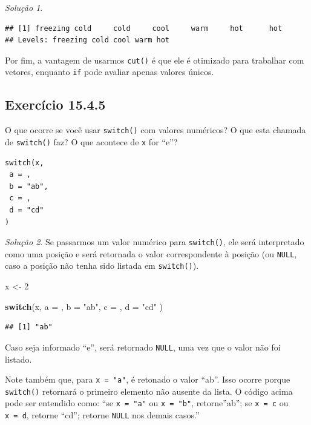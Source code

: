\documentclass[
]{latex/krantz}
\newenvironment{Shaded}{\begin{snugshade}}{\end{snugshade}}
\newcommand{\AttributeTok}[1]{\textcolor[rgb]{0.13,0.29,0.53}{#1}}
\newcommand{\ControlFlowTok}[1]{\textcolor[rgb]{0.13,0.29,0.53}{\textbf{#1}}}
\newcommand{\DecValTok}[1]{\textcolor[rgb]{0.00,0.00,0.81}{#1}}
\newcommand{\NormalTok}[1]{#1}
\newcommand{\OtherTok}[1]{\textcolor[rgb]{0.56,0.35,0.01}{#1}}
\newcommand{\StringTok}[1]{\textcolor[rgb]{0.31,0.60,0.02}{#1}}
\theoremstyle{definition}
\theoremstyle{definition}
\theoremstyle{definition}
\theoremstyle{definition}
\theoremstyle{remark}
\newtheorem*{solution}{Solução}
\begin{document}
\begin{solution}
\begin{verbatim}
## [1] freezing cold     cold     cool     warm     hot      hot     
## Levels: freezing cold cool warm hot
\end{verbatim}

Por fim, a vantagem de usarmos \texttt{cut()} é que ele é otimizado para trabalhar com vetores, enquanto \texttt{if} pode avaliar apenas valores únicos.
\end{solution}

\hypertarget{exr15-4-5}{%
\subsection*{Exercício 15.4.5}\label{exr15-4-5}}

O que ocorre se você usar \texttt{switch()} com valores numéricos? O que esta chamada de \texttt{switch()} faz? O que acontece de \texttt{x} for ``e''?

\begin{verbatim}
switch(x,
 a = ,
 b = "ab",
 c = ,
 d = "cd"
)
\end{verbatim}

\begin{solution}
Se passarmos um valor numérico para \texttt{switch()}, ele será interpretado como uma posição e será retornada o valor correspondente à posição (ou \texttt{NULL}, caso a posição não tenha sido listada em \texttt{switch()}).

\begin{Shaded}
\begin{Highlighting}[]
\NormalTok{x }\OtherTok{\textless{}{-}} \DecValTok{2}

\ControlFlowTok{switch}\NormalTok{(x,}
 \AttributeTok{a =}\NormalTok{ ,}
 \AttributeTok{b =} \StringTok{"ab"}\NormalTok{,}
 \AttributeTok{c =}\NormalTok{ ,}
 \AttributeTok{d =} \StringTok{"cd"}
\NormalTok{)}
\end{Highlighting}
\end{Shaded}

\begin{verbatim}
## [1] "ab"
\end{verbatim}

Caso seja informado ``e'', será retornado \texttt{NULL}, uma vez que o valor não foi listado.

Note também que, para \texttt{x\ =\ "a"}, é retonado o valor ``ab''. Isso ocorre porque \texttt{switch()} retornará o primeiro elemento não ausente da lista. O código acima pode ser entendido como: ``se \texttt{x\ =\ "a"} ou \texttt{x\ =\ "b"}, retorne''ab''; se \texttt{x\ =\ c} ou \texttt{x\ =\ d}, retorne ``cd''; retorne \texttt{NULL} nos demais casos.''
\end{solution}
\end{document}
